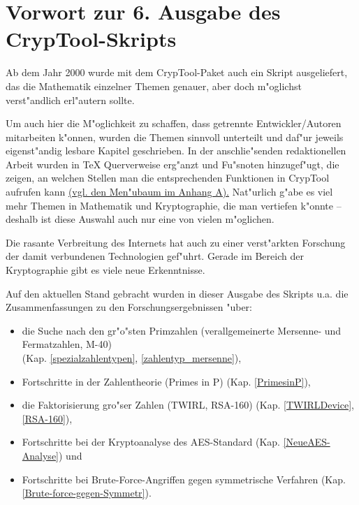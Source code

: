 

\section*{Vorwort zur 6. Ausgabe des CrypTool-Skripts}  

Ab dem Jahr 2000 wurde mit dem CrypTool-Paket auch ein Skript 
ausgeliefert, das die Mathematik einzelner Themen genauer, aber doch 
m"oglichst verst"andlich erl"autern sollte.

Um auch hier die M"oglichkeit zu schaffen, dass getrennte Entwickler/Autoren
mitarbeiten k"onnen, wurden die Themen sinnvoll unterteilt und daf"ur jeweils
eigenst"andig lesbare Kapitel geschrieben. In der anschlie"senden redaktionellen
Arbeit wurden in TeX Querverweise erg"anzt und Fu"snoten hinzugef"ugt, die
zeigen, an welchen Stellen man die entsprechenden Funktionen in
CrypTool aufrufen kann 
\hyperlink{appendix-menutree}{(vgl. den Men"ubaum im Anhang A).}
Nat"urlich g"abe es viel mehr Themen in Mathematik und Kryptographie, die
man vertiefen k"onnte -- deshalb ist diese Auswahl auch nur eine von
vielen m"oglichen.

Die rasante Verbreitung des Internets hat auch zu einer verst"arkten 
Forschung der damit verbundenen Technologien gef"uhrt. Gerade im Bereich 
der Kryptographie gibt es viele neue Erkenntnisse.

Auf den aktuellen Stand gebracht wurden in dieser Ausgabe 
des Skripts u.a. die Zusammenfassungen zu den Forschungsergebnissen "uber:                   
\vspace{-7pt}
\begin{itemize}
  \item die Suche nach den gr"o"sten Primzahlen (verallgemeinerte
        Mersenne- und Fermatzahlen, \glqq M-40\grqq) 
	\\ (Kap. \ref{spezialzahlentypen}, \ref{zahlentyp_mersenne}),
  \item Fortschritte in der Zahlentheorie (\glqq Primes in P\grqq)
        (Kap. \ref{PrimesinP}),
  \item die Faktorisierung gro"ser Zahlen (TWIRL, RSA-160) 
        (Kap. \ref{TWIRLDevice}, \ref{RSA-160}),
  \item Fortschritte bei der Kryptoanalyse des AES-Standard 
        (Kap. \ref{NeueAES-Analyse}) und
  \item Fortschritte bei Brute-Force-Angriffen gegen symmetrische Verfahren
	(Kap. \ref{Brute-force-gegen-Symmetr}).
\end{itemize}

